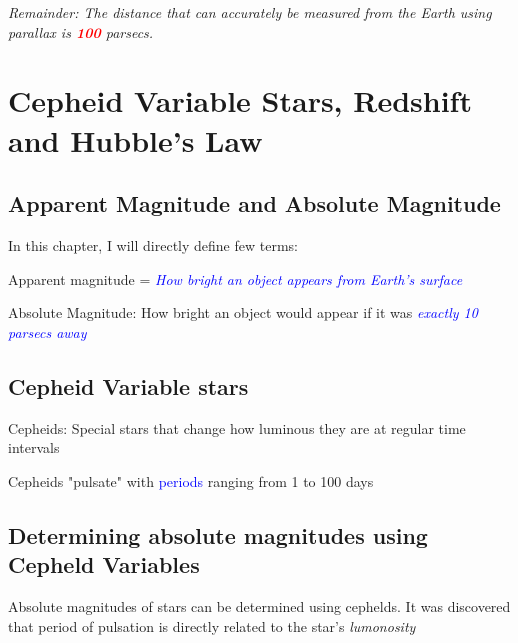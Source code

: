 \textit{Remainder: The distance that can accurately be measured from the Earth using parallax is \textbf{\textcolor{red}{100}} parsecs.}

\newpage
\section{Cepheid Variable Stars, Redshift and Hubble's Law}
\subsection{Apparent Magnitude and Absolute Magnitude}
In this chapter, I will directly define few terms:

\begin{greenblock}
    \begin{definition}
    Apparent magnitude = \textit{\textcolor{blue}{How bright an object appears from Earth's surface}}
    \end{definition}
\end{greenblock}


\begin{greenblock}
    \begin{definition}
    Absolute Magnitude: How bright an object would appear if it was \textit{\textcolor{blue}{exactly 10 parsecs away}}
    \end{definition}
\end{greenblock}


\subsection{Cepheid Variable stars}
\begin{greenblock}
   \begin{definition}
    Cepheids: Special stars that change how luminous they are at regular time intervals
    \end{definition} 
\end{greenblock}


Cepheids "pulsate" with \textcolor{blue}{periods} ranging from 1 to 100 days

\subsection{Determining absolute magnitudes using Cepheld Variables}
Absolute magnitudes of stars can be determined using cephelds. It was discovered that period of pulsation is directly related to the star's \textit{lumonosity}

